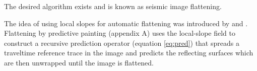 

The desired algorithm exists and is known as seismic image flattening. 
\begin{comment}
Flattening is a common task in geophysical interpretation and is
typically used to identify stratigraphic features within a seismic
image. It attempts to reverse the effects of geologic processes by
removing all the complex structures (\rFg{flat-0-all}a) present in the
image to make these structural features flat (\rFg{flat-0-all}c). A
flattened image is typically created by shifting samples in the
original image up or down. In the recent past we can find in the
literature different approaches and solutions to make this process
fully automated. The methods proposed by \cite{lomask:P13},
\cite{parks:2010} and \cite{fomel:acc} use an estimate of local image
slopes to estimate the vertical shift field at each sample in the
image.
\end{comment}
The idea
of using local slopes for automatic flattening was introduced by
\cite{bienati} and \cite{lomask:P13}. 
Flattening by predictive painting (appendix A)
uses the local-slope field 
to construct a recursive prediction operator (equation \ref{eq:pred}) that spreads a traveltime reference trace in the image and predicts the reflecting surfaces 
which are then unwrapped until the image is flattened.


